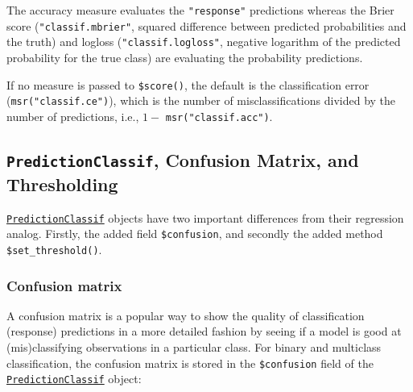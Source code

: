 The accuracy measure evaluates the \texttt{"response"}
predictions whereas the Brier score
(\texttt{"classif.mbrier"}, squared difference between predicted
probabilities and the truth) and logloss
(\texttt{"classif.logloss"}, negative logarithm of the predicted
probability for the true class) are evaluating the probability
predictions.

If no measure is passed to
\texttt{\$score()}, the
default is the classification error
(\texttt{msr("classif.ce")}), which is the number of misclassifications
divided by the number of predictions, i.e., \(1 -\)
\texttt{msr("classif.acc")}.

\hypertarget{sec-classif-prediction}{%
\subsection{\texorpdfstring{\texttt{PredictionClassif}, Confusion
Matrix, and
Thresholding}{PredictionClassif, Confusion Matrix, and Thresholding}}\label{sec-classif-prediction}}

\href{https://mlr3.mlr-org.com/reference/PredictionClassif.html}{\texttt{PredictionClassif}}
objects have two important differences from their regression analog.
Firstly, the added field \texttt{\$confusion}, and secondly the added
method
\texttt{\$set\_threshold()}.

\hypertarget{confusion-matrix}{%
\subsubsection*{Confusion matrix}\label{confusion-matrix}}

A confusion
matrix is a popular way to show the quality of
classification (response) predictions in a more detailed fashion by
seeing if a model is good at (mis)classifying observations in a
particular class. For binary and multiclass classification, the
confusion matrix is stored in the
\texttt{\$confusion}
field of the
\href{https://mlr3.mlr-org.com/reference/PredictionClassif.html}{\texttt{PredictionClassif}}
object:

